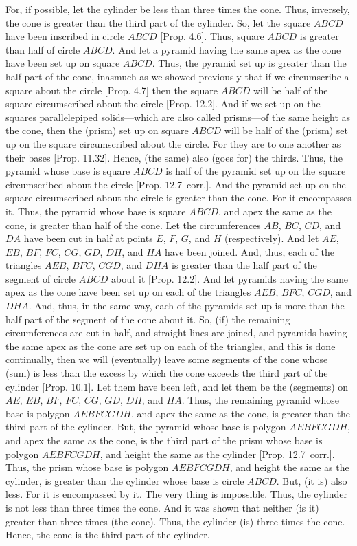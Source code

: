 \begin{Parallel}{}{}
{For, if possible, let the cylinder be less than three times the cone. Thus, inversely, the cone is greater than the third
part of the cylinder. So, let the square $ABCD$ have been inscribed in circle $ABCD$  [Prop. 4.6]. Thus, square $ABCD$ is greater
than half of circle $ABCD$. 
And let a pyramid having the same apex as the cone have been set up on square  $ABCD$. Thus, the pyramid set up
is greater than the half part of the cone, inasmuch as we showed previously that if we circumscribe a square
about the circle [Prop. 4.7] then the square $ABCD$ will be half of the square circumscribed about the circle [Prop. 12.2]. And if we set up   on the squares parallelepiped solids---which are also
called prisms---of the same height as the cone, then the (prism) set up on square $ABCD$ will be half of the (prism) set up on the square circumscribed
about the circle. For they are to one another as their bases [Prop. 11.32]. Hence, (the same) also (goes for) the thirds.  Thus, the pyramid whose base is square $ABCD$ is half of the pyramid set up on the square
circumscribed about the circle [Prop. 12.7~corr.]. And the pyramid set up on the square
circumscribed about the circle is greater than the cone. For it encompasses it. Thus, the pyramid whose
base is square $ABCD$, and apex the same as the cone, is greater than half of the cone. Let the circumferences $AB$,
$BC$, $CD$, and $DA$ have been cut in half at points $E$, $F$, $G$, and $H$ (respectively).  And let $AE$, $EB$, $BF$,
$FC$, $CG$, $GD$, $DH$, and $HA$ have been joined. And, thus, each of the triangles $AEB$, $BFC$,
$CGD$, and $DHA$ is greater than the half part of the segment of circle $ABCD$ about it [Prop. 12.2].
And let pyramids having the same apex as the cone have been set up on each of the triangles $AEB$,
$BFC$, $CGD$, and $DHA$. And, thus, in the same way, each of the pyramids set up is more than the  half part of
the segment of the cone about it. So, (if) the remaining circumferences are cut in half, and straight-lines
are joined, and pyramids having the same apex as the cone are set up on each of the triangles, and this is
done continually, then we will (eventually) leave some segments of the cone 
whose (sum) is less than
the excess by which the cone exceeds the third part of the cylinder [Prop. 10.1]. 
Let them have been left, and let them be the (segments) on $AE$, $EB$, $BF$, $FC$, $CG$, $GD$,
$DH$, and $HA$. Thus, the remaining pyramid whose base is polygon $AEBFCGDH$, and apex the
same as the cone, is greater than the third part of the cylinder. But, the pyramid whose base is
polygon $AEBFCGDH$, and apex the same as the cone, is the third part of the prism whose base
is polygon $AEBFCGDH$, and height the same as the cylinder [Prop. 12.7~corr.].
Thus, the prism whose base is polygon $AEBFCGDH$, and height the same as the cylinder, is greater than
the cylinder whose base is circle $ABCD$. But, (it is) also less. For it is encompassed by it. The very thing
is impossible. Thus, the cylinder is not less than three times the cone. And it was shown that neither (is it)
greater than three times (the cone). Thus, the cylinder (is) three times the cone. Hence, the cone is the
third part of the cylinder.

}
\end{Parallel}
